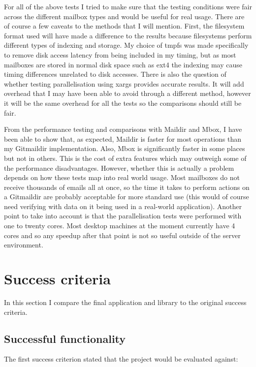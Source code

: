 For all of the above tests I tried to make sure that the testing conditions were fair across the different mailbox types and would be useful for real usage. There are of course a few caveats to the methods that I will mention. First, the filesystem format used will have made a difference to the results because filesystems perform different types of indexing and storage. My choice of tmpfs was made specifically to remove disk access latency from being included in my timing, but as most mailboxes are stored in normal disk space such as ext4 the indexing may cause timing differences unrelated to disk accesses. There is also the question of whether testing parallelisation using xargs provides accurate results. It will add overhead that I may have been able to avoid through a different method, however it will be the same overhead for all the tests so the comparisons should still be fair.

From the performance testing and comparisons with Maildir and Mbox, I have been able to show that, as expected, Maildir is faster for most operations than my Gitmaildir implementation. Also, Mbox is significantly faster in some places but not in others. This is the cost of extra features which may outweigh some of the performance disadvantages. However, whether this is actually a problem depends on how these tests map into real world usage. Most mailboxes do not receive thousands of emails all at once, so the time it takes to perform actions on a Gitmaildir are probably acceptable for more standard use (this would of course need verifying with data on it being used in a real-world application). Another point to take into account is that the parallelisation tests were performed with one to twenty cores. Most desktop machines at the moment currently have 4 cores and so any speedup after that point is not so useful outside of the server environment.

\section{Success criteria}

In this section I compare the final application and library to the original success criteria.

\subsection{Successful functionality}

The first success criterion stated that the project would be evaluated against:

